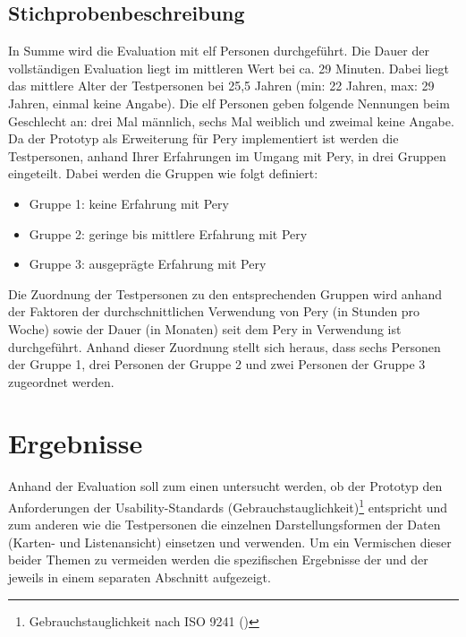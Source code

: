 \documentclass[Bachelorarbeit.tex]{subfiles}
\begin{document}
\subsection{Stichprobenbeschreibung}
\label{Stichproben}
In Summe wird die Evaluation mit elf Personen durchgeführt. 
Die Dauer der vollständigen Evaluation liegt im mittleren Wert bei ca. 29 Minuten.
Dabei liegt das mittlere Alter der Testpersonen bei 25,5 Jahren (min: 22 Jahren, max: 29 Jahren, einmal keine Angabe). 
Die elf Personen geben folgende Nennungen beim Geschlecht an: drei Mal männlich, sechs Mal weiblich und zweimal keine Angabe.
Da der Prototyp als Erweiterung für Pery implementiert ist werden die Testpersonen, anhand Ihrer Erfahrungen im Umgang mit Pery, in drei Gruppen eingeteilt.
Dabei werden die Gruppen wie folgt definiert: 
\begin{itemize}		
	\item Gruppe 1: keine Erfahrung mit Pery 
	\item Gruppe 2: geringe bis mittlere Erfahrung mit Pery
	\item Gruppe 3: ausgeprägte Erfahrung mit Pery
\end{itemize}
Die Zuordnung der Testpersonen zu den entsprechenden Gruppen wird anhand der Faktoren der durchschnittlichen Verwendung von Pery (in Stunden pro Woche) sowie der Dauer (in Monaten) seit dem Pery in Verwendung ist durchgeführt.
Anhand dieser Zuordnung stellt sich heraus, dass sechs Personen der Gruppe 1, drei Personen der Gruppe 2 und zwei Personen der Gruppe 3 zugeordnet werden. 

\section{Ergebnisse}
\label{Ergebnisse}
Anhand der Evaluation soll zum einen untersucht werden, ob der Prototyp den Anforderungen der Usability-Standards (Gebrauchstauglichkeit)\footnote{Gebrauchstauglichkeit nach ISO 9241 (\cite[siehe:][Abs.: 3.1 Gebrauchstauglichkeit]{Iso9241_11})} entspricht und zum anderen wie die Testpersonen die einzelnen Darstellungsformen der Daten (Karten- und Listenansicht) einsetzen und verwenden. 
Um ein Vermischen dieser beider Themen zu vermeiden werden die spezifischen Ergebnisse der  und der  jeweils in einem separaten Abschnitt aufgezeigt.
\end{document}
